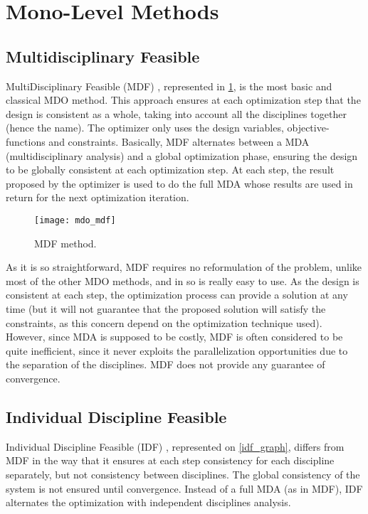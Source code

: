 \section{Mono-Level Methods}

\subsection{Multidisciplinary Feasible}

MultiDisciplinary Feasible (MDF) \cite{cramer1994problem}, represented in \figurename{} \ref{mdf_graph}, is the most basic and classical MDO method. This approach ensures at each optimization step that the design is consistent as a whole, taking into account all the disciplines together (hence the name). The optimizer only uses the design variables, objective-functions and constraints.
Basically, MDF alternates between a MDA (multidisciplinary analysis) and a global optimization phase, ensuring the design to be globally consistent at each optimization step. At each step, the result proposed by the optimizer is used to do the full MDA whose results are used in return for the next optimization iteration.

\begin{figure}
\centering
\texttt{[image: mdo\_mdf]}
\caption{MDF method.}\label{mdf_graph}
\end{figure}

As it is so straightforward, MDF requires no reformulation of the problem, unlike most of the other MDO methods, and in so is really easy to use. As the design is consistent at each step, the optimization process can provide a solution at any time (but it will not guarantee that the proposed solution will satisfy the constraints, as this concern depend on the optimization technique used). However, since MDA is supposed to be costly, MDF is often considered to be quite inefficient, since it never exploits the parallelization opportunities due to the separation of the disciplines. MDF does not provide any guarantee of convergence.

\subsection{Individual Discipline Feasible}

Individual Discipline Feasible (IDF) \cite{cramer1994problem}, represented on \figurename{} \ref{idf_graph}, differs from MDF in the way that it ensures at each step consistency for each discipline separately, but not consistency between disciplines. The global consistency of the system is not ensured until convergence.
Instead of a full MDA (as in MDF), IDF alternates the optimization with independent disciplines analysis.

